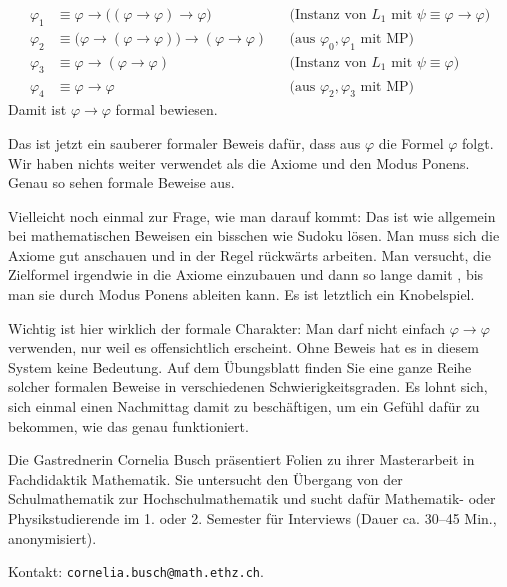 \begin{math-stroke}
\begin{short-proof}
\begin{align*}
    \varphi_1 &\equiv \varphi \to \bigl((\varphi \to \varphi) \to \varphi\bigr) && \text{(Instanz von } L_1 \text{ mit } \psi \equiv \varphi \to \varphi\text{)} \\
    \varphi_2 &\equiv \bigl(\varphi \to (\varphi \to \varphi)\bigr) \to (\varphi \to \varphi) && \text{(aus } \varphi_0, \varphi_1 \text{ mit MP)} \\
    \varphi_3 &\equiv \varphi \to (\varphi \to \varphi) && \text{(Instanz von } L_1 \text{ mit } \psi \equiv \varphi\text{)} \\
    \varphi_4 &\equiv \varphi \to \varphi && \text{(aus } \varphi_2, \varphi_3 \text{ mit MP)}
\end{align*}
Damit ist $\varphi \to \varphi$ formal bewiesen.
\end{short-proof}
\end{math-stroke}

\begin{spoken-clean}[00:38:57 - 00:41:28]
Das ist jetzt ein sauberer formaler Beweis dafür, dass aus $\varphi$ die Formel $\varphi$ folgt. Wir haben nichts weiter verwendet als die Axiome und den Modus Ponens. Genau so sehen formale Beweise aus.

Vielleicht noch einmal zur Frage, wie man darauf kommt: Das ist wie allgemein bei mathematischen Beweisen ein bisschen wie Sudoku lösen. Man muss sich die Axiome gut anschauen und in der Regel rückwärts arbeiten. Man versucht, die Zielformel irgendwie in die Axiome einzubauen und dann so lange damit , bis man sie durch Modus Ponens ableiten kann. Es ist letztlich ein Knobelspiel.

Wichtig ist hier wirklich der formale Charakter: Man darf nicht einfach $\varphi \to \varphi$ verwenden, nur weil es offensichtlich erscheint. Ohne Beweis hat es in diesem System keine Bedeutung. Auf dem Übungsblatt finden Sie eine ganze Reihe solcher formalen Beweise in verschiedenen Schwierigkeitsgraden. Es lohnt sich, sich einmal einen Nachmittag damit zu beschäftigen, um ein Gefühl dafür zu bekommen, wie das genau funktioniert.
\end{spoken-clean}

\begin{meta-note}
Die Gastrednerin Cornelia Busch präsentiert Folien zu ihrer Masterarbeit in Fachdidaktik Mathematik. Sie untersucht den Übergang von der Schulmathematik zur Hochschulmathematik und sucht dafür Mathematik- oder Physikstudierende im 1. oder 2. Semester für Interviews (Dauer ca. 30--45 Min., anonymisiert). 

Kontakt: \texttt{cornelia.busch@math.ethz.ch}.
\end{meta-note}

